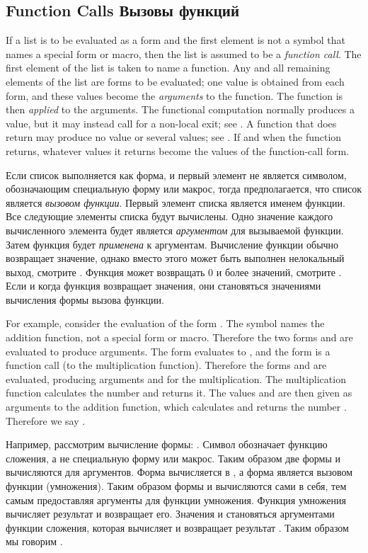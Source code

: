 \subsection{Function Calls Вызовы функций}

If a list is to be evaluated as a form and the first element is
not a symbol that names a special form or macro, then the list
is assumed to be a \textit{function call}.  The first element of the
list is taken to name a function.  Any and all remaining elements
of the list are forms to be evaluated; one value is obtained
from each form,
and these values become the \textit{arguments} to the function.
The function is then \textit{applied} to the arguments.
The functional computation normally produces a value,
but it may instead call for a non-local exit; see .
A function that does return may produce no value or several values;
see .
If and when the function returns, whatever values it returns
become the values of the function-call form.

Если список выполняется как форма, и первый элемент не является символом,
обозначающим специальную форму или макрос, тогда предполагается, что список
является \textit{вызовом функции}. Первый элемент списка является именем
функции. Все следующие элементы списка будут вычислены. Одно значение каждого
вычисленного элемента будет является \textit{аргументом} для вызываемой
функции. 
Затем функция будет \textit{применена} к аргументам. Вычисление функции обычно
возвращает значение, однако вместо этого может быть выполнен нелокальный выход,
смотрите . Функция может возвращать 0 и более значений, смотрите
. 
Если и когда функция возвращает значения, они становяться значениями вычисления
формы вызова функции.

For example, consider the evaluation of the form .
The symbol \cdf{+} names the addition function, not a special form or macro.
Therefore the two forms  and  are evaluated to produce
arguments.  The form  evaluates to , and the form
 is a function call (to the multiplication function).
Therefore the forms  and  are evaluated, producing arguments
 and  for the multiplication.  The multiplication function
calculates the number  and returns it.  The values  and 
are then given as arguments to the addition function, which calculates
and returns the number .  Therefore we say .

Например, рассмотрим вычисление формы: .
Символ \cdf{+} обозначает функцию сложения, а не специальную форму или макрос.
Таким образом две формы  и  вычисляются для аргументов. Форма
 вычисляется в , а форма  является вызовом функции
(умножения). Таким образом формы  и  вычисляются сами в себя, тем
самым предоставляя аргументы для функции умножения. Функция умножения вычисляет
результат  и возвращает его. Значения  и  становяться
аргументами функции сложения, которая вычисляет и возвращает результат
. Таким образом мы говорим .

